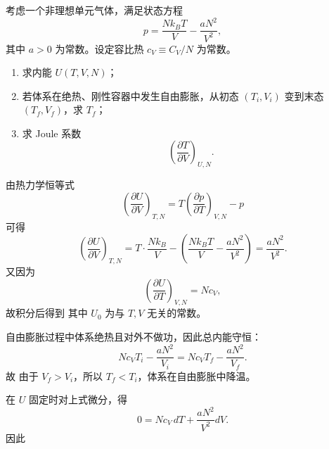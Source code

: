 ﻿

\begin{question}
考虑一个非理想单元气体，满足状态方程
\[
p=\frac{Nk_B T}{V}-\frac{aN^2}{V^2},
\]
其中 $a>0$ 为常数。设定容比热 $c_V\equiv C_V/N$ 为常数。

\begin{enumerate}[label=(\arabic*),leftmargin=2.5em]
  \item 求内能 $U(T,V,N)$；
  \item 若体系在绝热、刚性容器中发生自由膨胀，从初态 $(T_i,V_i)$ 变到末态 $(T_f,V_f)$，求 $T_f$；
  \item 求 Joule 系数
  \[
  \left(\frac{\partial T}{\partial V}\right)_{U,N}.
  \]
\end{enumerate}

\begin{solution}
由热力学恒等式
\[
\left(\frac{\partial U}{\partial V}\right)_{T,N}=T\left(\frac{\partial p}{\partial T}\right)_{V,N}-p
\]
可得
\[
\left(\frac{\partial U}{\partial V}\right)_{T,N}=T\cdot \frac{Nk_B}{V}-\left(\frac{Nk_B T}{V}-\frac{aN^2}{V^2}\right)=\frac{aN^2}{V^2}.
\]
又因为
\[
\left(\frac{\partial U}{\partial T}\right)_{V,N}=Nc_V,
\]
故积分后得到
其中 $U_0$ 为与 $T,V$ 无关的常数。

自由膨胀过程中体系绝热且对外不做功，因此总内能守恒：
\[
Nc_V T_i-\frac{aN^2}{V_i}=Nc_V T_f-\frac{aN^2}{V_f}.
\]
故
由于 $V_f>V_i$，所以 $T_f<T_i$，体系在自由膨胀中降温。

在 $U$ 固定时对上式微分，得
\[
0=Nc_V\,dT+\frac{aN^2}{V^2}dV.
\]
因此
\end{solution}
\end{question}

